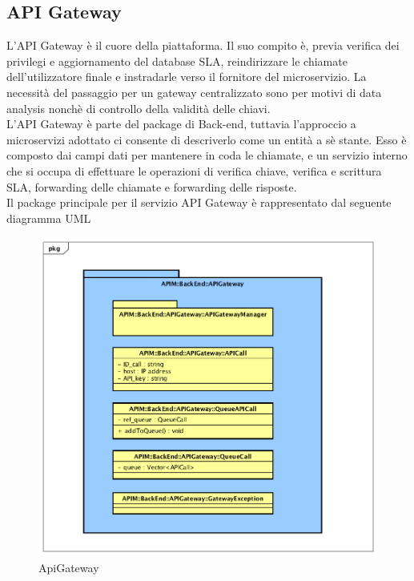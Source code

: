 \subsection{API Gateway}

L'API Gateway è il cuore della piattaforma. Il suo compito è, previa verifica dei privilegi e aggiornamento del database SLA, reindirizzare le chiamate dell'utilizzatore finale e instradarle verso il fornitore del microservizio.  La necessità del passaggio per un gateway centralizzato sono per motivi di data analysis nonchè di controllo della validità delle chiavi. \\

L'API Gateway è parte del package di Back-end, tuttavia l'approccio a microservizi adottato ci consente di descriverlo come un entità a sè stante. Esso è composto dai campi dati per mantenere in coda le chiamate, e un servizio interno che si occupa di effettuare le operazioni di verifica chiave, verifica e scrittura SLA, forwarding delle chiamate e forwarding delle risposte.  \\

Il package principale per il servizio API Gateway è rappresentato dal seguente diagramma UML 

\begin{figure}[!htbp]
	\centering
	\includegraphics[scale=0.45]{UML/DiagrammiPackage/ApiGateway.png}
	\caption{ApiGateway}
\end{figure}

